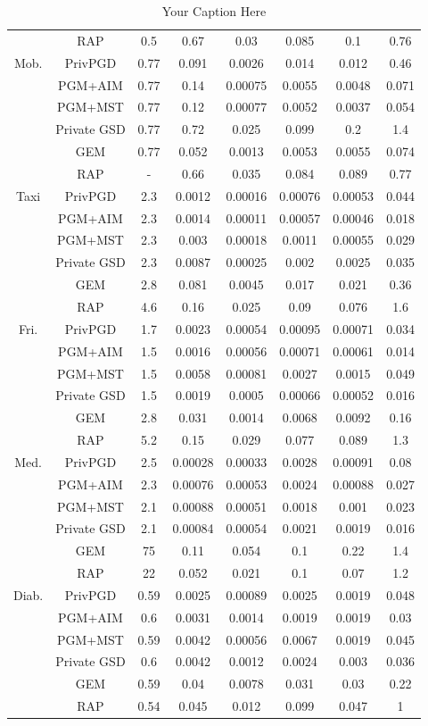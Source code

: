 \begin{table*}[ht]
\begin{tabular}{cccccccc}
 & RAP&0.5 & 0.67 & 0.03 & 0.085 & 0.1 & 0.76 \\
\multirow{6}{*}{Mob. } & PrivPGD&0.77 & 0.091 & 0.0026 & 0.014 & 0.012 & 0.46 \\
 & PGM+AIM&0.77 & 0.14 & 0.00075 & 0.0055 & 0.0048 & 0.071 \\
 & PGM+MST&0.77 & 0.12 & 0.00077 & 0.0052 & 0.0037 & 0.054 \\
 & Private GSD&0.77 & 0.72 & 0.025 & 0.099 & 0.2 & 1.4 \\
 & GEM&0.77 & 0.052 & 0.0013 & 0.0053 & 0.0055 & 0.074 \\
 & RAP&- & 0.66 & 0.035 & 0.084 & 0.089 & 0.77 \\
\multirow{6}{*}{Taxi } & PrivPGD&2.3 & 0.0012 & 0.00016 & 0.00076 & 0.00053 & 0.044 \\
 & PGM+AIM&2.3 & 0.0014 & 0.00011 & 0.00057 & 0.00046 & 0.018 \\
 & PGM+MST&2.3 & 0.003 & 0.00018 & 0.0011 & 0.00055 & 0.029 \\
 & Private GSD&2.3 & 0.0087 & 0.00025 & 0.002 & 0.0025 & 0.035 \\
 & GEM&2.8 & 0.081 & 0.0045 & 0.017 & 0.021 & 0.36 \\
 & RAP&4.6 & 0.16 & 0.025 & 0.09 & 0.076 & 1.6 \\
\multirow{6}{*}{Fri. } & PrivPGD&1.7 & 0.0023 & 0.00054 & 0.00095 & 0.00071 & 0.034 \\
 & PGM+AIM&1.5 & 0.0016 & 0.00056 & 0.00071 & 0.00061 & 0.014 \\
 & PGM+MST&1.5 & 0.0058 & 0.00081 & 0.0027 & 0.0015 & 0.049 \\
 & Private GSD&1.5 & 0.0019 & 0.0005 & 0.00066 & 0.00052 & 0.016 \\
 & GEM&2.8 & 0.031 & 0.0014 & 0.0068 & 0.0092 & 0.16 \\
 & RAP&5.2 & 0.15 & 0.029 & 0.077 & 0.089 & 1.3 \\
\multirow{6}{*}{Med. } & PrivPGD&2.5 & 0.00028 & 0.00033 & 0.0028 & 0.00091 & 0.08 \\
 & PGM+AIM&2.3 & 0.00076 & 0.00053 & 0.0024 & 0.00088 & 0.027 \\
 & PGM+MST&2.1 & 0.00088 & 0.00051 & 0.0018 & 0.001 & 0.023 \\
 & Private GSD&2.1 & 0.00084 & 0.00054 & 0.0021 & 0.0019 & 0.016 \\
 & GEM&75 & 0.11 & 0.054 & 0.1 & 0.22 & 1.4 \\
 & RAP&22 & 0.052 & 0.021 & 0.1 & 0.07 & 1.2 \\
\multirow{6}{*}{Diab. } & PrivPGD&0.59 & 0.0025 & 0.00089 & 0.0025 & 0.0019 & 0.048 \\
 & PGM+AIM&0.6 & 0.0031 & 0.0014 & 0.0019 & 0.0019 & 0.03 \\
 & PGM+MST&0.59 & 0.0042 & 0.00056 & 0.0067 & 0.0019 & 0.045 \\
 & Private GSD&0.6 & 0.0042 & 0.0012 & 0.0024 & 0.003 & 0.036 \\
 & GEM&0.59 & 0.04 & 0.0078 & 0.031 & 0.03 & 0.22 \\
 & RAP&0.54 & 0.045 & 0.012 & 0.099 & 0.047 & 1 \\
\bottomrule
\end{tabular}
\caption{Your Caption Here}
\end{table*}
